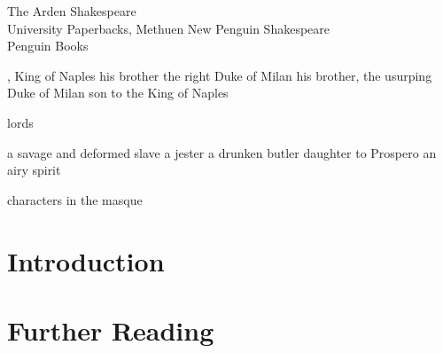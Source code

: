 \documentclass[11pt]{book}
\begin{document}
              {
                           {The Arden Shakespeare\\[.5ex]
                             University Paperbacks, Methuen}
                           {New Penguin Shakespeare\\[.5ex]
                             Penguin Books}
              }

\begin{DramatisPersonae}

, King of Naples
 his brother
 the right Duke of Milan
 his brother, the usurping Duke of Milan
 son to the King of Naples

\begin{Characters}{lords}
\end{Characters} 

 a savage and deformed slave
 a jester
 a drunken butler
{\Facies {}
}
 daughter to Prospero
 an airy spirit

\begin{Characters}{characters in the masque}
{\Facies {}
}
\end{Characters}

\end{DramatisPersonae}

\newpage


\chapter {Introduction}

\lorem [31453] 

\chapter {Further Reading}

\lorem [24262] 
\end{document}
